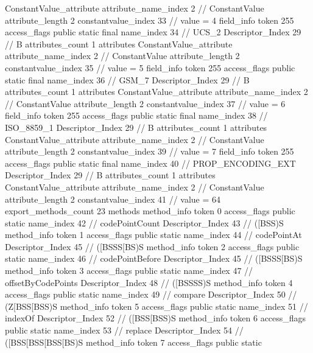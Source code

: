 {{{{{{				ConstantValue_attribute {
					attribute_name_index	2		// ConstantValue
					attribute_length	2
					constantvalue_index	33		// value = 4
				}
				}
			}
			field_info {
				token	255
				access_flags	public static final
				name_index	34		// UCS_2
				Descriptor_Index	29		// B
				attributes_count	1
				attributes {
				ConstantValue_attribute {
					attribute_name_index	2		// ConstantValue
					attribute_length	2
					constantvalue_index	35		// value = 5
				}
				}
			}
			field_info {
				token	255
				access_flags	public static final
				name_index	36		// GSM_7
				Descriptor_Index	29		// B
				attributes_count	1
				attributes {
				ConstantValue_attribute {
					attribute_name_index	2		// ConstantValue
					attribute_length	2
					constantvalue_index	37		// value = 6
				}
				}
			}
			field_info {
				token	255
				access_flags	public static final
				name_index	38		// ISO_8859_1
				Descriptor_Index	29		// B
				attributes_count	1
				attributes {
				ConstantValue_attribute {
					attribute_name_index	2		// ConstantValue
					attribute_length	2
					constantvalue_index	39		// value = 7
				}
				}
			}
			field_info {
				token	255
				access_flags	public static final
				name_index	40		// PROP_ENCODING_EXT
				Descriptor_Index	29		// B
				attributes_count	1
				attributes {
				ConstantValue_attribute {
					attribute_name_index	2		// ConstantValue
					attribute_length	2
					constantvalue_index	41		// value = 64
				}
				}
			}
			}
			export_methods_count	23
			methods {
				method_info {
					token	0
					access_flags	public static
					name_index	42		// codePointCount
					Descriptor_Index	43		// ([BSS)S
				}
				method_info {
					token	1
					access_flags	public static
					name_index	44		// codePointAt
					Descriptor_Index	45		// ([BSSS[BS)S
				}
				method_info {
					token	2
					access_flags	public static
					name_index	46		// codePointBefore
					Descriptor_Index	45		// ([BSSS[BS)S
				}
				method_info {
					token	3
					access_flags	public static
					name_index	47		// offsetByCodePoints
					Descriptor_Index	48		// ([BSSSS)S
				}
				method_info {
					token	4
					access_flags	public static
					name_index	49		// compare
					Descriptor_Index	50		// (Z[BSS[BSS)S
				}
				method_info {
					token	5
					access_flags	public static
					name_index	51		// indexOf
					Descriptor_Index	52		// ([BSS[BSS)S
				}
				method_info {
					token	6
					access_flags	public static
					name_index	53		// replace
					Descriptor_Index	54		// ([BSS[BSS[BSS[BS)S
				}
				method_info {
					token	7
					access_flags	public static
}}}}}
